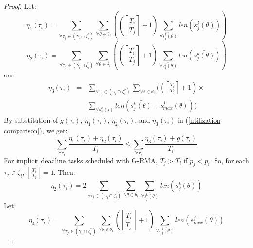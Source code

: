 \begin{proof}
Let:
%
\begin{equation*}
\eta_{1}(\tau_{i})=\sum_{\forall\tau_{j}\in(\gamma_{i}\cap\zeta_{i}^{*})}\sum_{\forall\theta\in\theta_{i}}\left(\left(\left\lceil \frac{T_{i}}{T_{j}}\right\rceil +1\right)\sum_{\bar{\forall s_{j}^{k}(\theta)}}len\left(\bar{s_{j}^{k}(\theta)}\right)\right)
\end{equation*}
%
\begin{equation*}
\eta_{2}(\tau_{i})=\sum_{\forall\tau_{j}\in(\gamma_{i}\cap\bar{\zeta_{i}})}\sum_{\forall\theta\in\theta_{i}}\left(\left(\left\lceil \frac{T_{i}}{T_{j}}\right\rceil +1\right)\sum_{\bar{\forall s_{j}^{k}(\theta)}}len\left(\bar{s_{j}^{k}(\theta)}\right)\right)
\end{equation*}
%
and
%
\begin{eqnarray*}
\eta_{3}(\tau_{i}) & = & \sum_{\forall\tau_{j}\in(\gamma_{i}\cap\zeta_{i}^{*})}\sum_{\forall\theta\in\theta_{i}}\Bigg(\left(\left\lceil \frac{T_{i}}{T_{j}}\right\rceil +1\right)\times\\
 &  & \sum_{\forall\bar{s_{j}^{k}(\theta)}}len\left(\bar{s_{j}^{k}(\theta)}+s_{max}^{j}(\theta)\right)\Bigg)
\end{eqnarray*}
%
By substitution of $g(\tau_i)$, $\eta_1(\tau_i)$, $\eta_2(\tau_i)$, and $\eta_3(\tau_i)$ in (\ref{utilization comparison}), we get:
%
\begin{equation}
\sum_{\forall\tau_{i}}\frac{\eta_{1}(\tau_{i})+\eta_{2}(\tau_{i})}{T_{i}}\le\sum_{\forall\tau_{i}}\frac{\eta_{3}(\tau_{i})+g(\tau_{i})}{T_{i}}
\label{P-N-F rcm comparison 3}
\end{equation}
%
For implicit deadline tasks scheduled with 
G-RMA, $T_{j}>T_{i}$ if $p_{j}<p_{i}$. So, for each $\tau_{j}\in\bar{\zeta_{i}}$, $\left\lceil \frac{T_{i}}{T_{j}}\right\rceil =1$. Then:
%
\begin{equation}
\eta_{2}(\tau_{i})=2\sum_{\forall\tau_{j}\in(\gamma_{i}\cap\bar{\zeta_{i}})}\sum_{\forall\theta\in\theta_{i}}\sum_{\bar{\forall s_{j}^{k}(\theta)}}len\left(\bar{s_{j}^{k}(\theta)}\right)
\label{P-N-F rcm comparison 5}
\end{equation}
%
Let:
%
\begin{equation*}
\eta_{4}(\tau_{i})=\sum_{\forall\tau_{j}\in(\gamma_{i}\cap\zeta_{i}^{*})}\sum_{\forall\theta\in\theta_{i}}\left(\left\lceil \frac{T_{i}}{T_{j}}\right\rceil +1\right)\sum_{\forall\bar{s_{j}^{k}(\theta)}}len\left(s_{max}^{j}(\theta)\right)
\end{equation*}

\end{proof}
